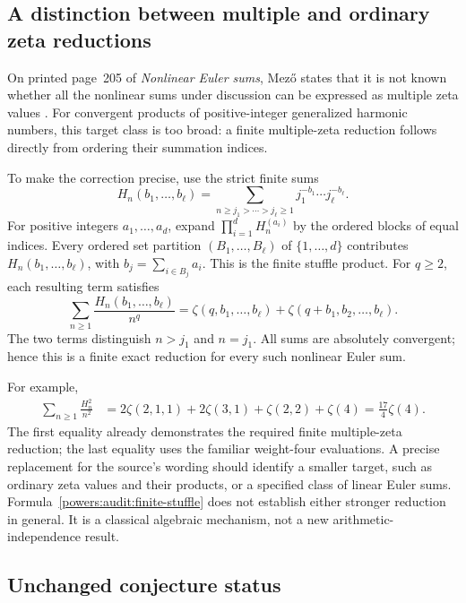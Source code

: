 \documentclass[11pt,a4paper]{article}
\numberwithin{equation}{section}
\theoremstyle{definition}
\theoremstyle{remark}
\begin{document}
\subsection{A distinction between multiple and ordinary zeta reductions}

On printed page~205 of \emph{Nonlinear Euler sums}, Mez\H{o}
states that it is not known whether all the nonlinear sums under
discussion can be expressed as multiple zeta values \cite{Mezo2014}.
For convergent products of positive-integer generalized harmonic
numbers, this target class is too broad: a finite multiple-zeta
reduction follows directly from ordering their summation indices.

To make the correction precise, use the strict finite sums
\[
 H_n(b_1,\ldots,b_\ell)
 =\sum_{n\ge j_1>\cdots>j_\ell\ge1}
       j_1^{-b_1}\cdots j_\ell^{-b_\ell}.
\]
For positive integers \(a_1,\ldots,a_d\), expand
\(\prod_{i=1}^d H_n^{(a_i)}\) by the ordered blocks of equal
indices. Every ordered set partition
\((B_1,\ldots,B_\ell)\) of \(\{1,\ldots,d\}\) contributes
\(H_n(b_1,\ldots,b_\ell)\), with
\(b_j=\sum_{i\in B_j}a_i\). This is the finite stuffle product.
For \(q\ge2\), each resulting term satisfies
\begin{equation}
 \sum_{n\ge1}\frac{H_n(b_1,\ldots,b_\ell)}{n^q}
 =\zeta(q,b_1,\ldots,b_\ell)
       +\zeta(q+b_1,b_2,\ldots,b_\ell).
 \label{powers:audit:finite-stuffle}
\end{equation}
The two terms distinguish \(n>j_1\) and \(n=j_1\).
All sums are absolutely convergent; hence this is a finite exact
reduction for every such nonlinear Euler sum.

For example,
\begin{align}
 \sum_{n\ge1}\frac{H_n^2}{n^2}
 &=2\zeta(2,1,1)+2\zeta(3,1)+\zeta(2,2)+\zeta(4)
   =\frac{17}{4}\zeta(4).
 \label{powers:audit:example}
\end{align}
The first equality already demonstrates the required finite
multiple-zeta reduction; the last equality uses the familiar
weight-four evaluations. A precise replacement for the source's
wording should identify a smaller target, such as ordinary zeta
values and their products, or a specified class of linear Euler
sums. Formula~\eqref{powers:audit:finite-stuffle} does not establish
either stronger reduction in general. It is a classical algebraic
mechanism, not a new arithmetic-independence result.

\subsection{Unchanged conjecture status}
\end{document}
